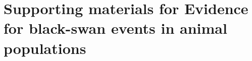 \chapter[Supporting materials]{Supporting materials for Evidence for black-swan
events in animal populations}
